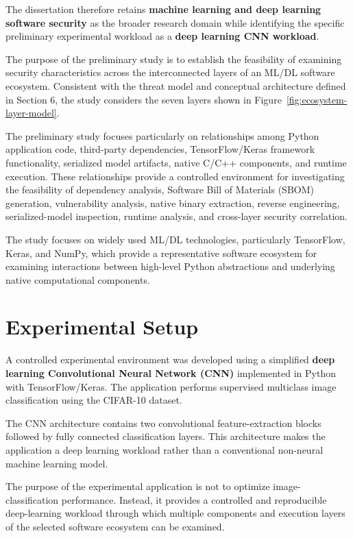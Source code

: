 \documentclass[
  12pt,
  letterpaper,
  oneside]{report}
\begin{document}
The dissertation therefore retains \textbf{machine learning and deep
learning software security} as the broader research domain while
identifying the specific preliminary experimental workload as a
\textbf{deep learning CNN workload}.

The purpose of the preliminary study is to establish the feasibility of
examining security characteristics across the interconnected layers of
an ML/DL software ecosystem. Consistent with the threat model and
conceptual architecture defined in Section 6, the study considers the
seven layers shown in Figure~\ref{fig:ecosystem-layer-model}.

The preliminary study focuses particularly on relationships among Python
application code, third-party dependencies, TensorFlow/Keras framework
functionality, serialized model artifacts, native C/C++ components, and
runtime execution. These relationships provide a controlled environment
for investigating the feasibility of dependency analysis, Software Bill
of Materials (SBOM) generation, vulnerability analysis, native binary
extraction, reverse engineering, serialized-model inspection, runtime
analysis, and cross-layer security correlation.

The study focuses on widely used ML/DL technologies, particularly
TensorFlow, Keras, and NumPy, which provide a representative software
ecosystem for examining interactions between high-level Python
abstractions and underlying native computational components.

\section{Experimental Setup}\label{92-experimental-setup}

A controlled experimental environment was developed using a simplified
\textbf{deep learning Convolutional Neural Network (CNN)} implemented in
Python with TensorFlow/Keras. The application performs supervised
multiclass image classification using the CIFAR-10 dataset.

The CNN architecture contains two convolutional feature-extraction
blocks followed by fully connected classification layers. This
architecture makes the application a deep learning workload rather than
a conventional non-neural machine learning model.

The purpose of the experimental application is not to optimize
image-classification performance. Instead, it provides a controlled and
reproducible deep-learning workload through which multiple components
and execution layers of the selected software ecosystem can be examined.
\end{document}
